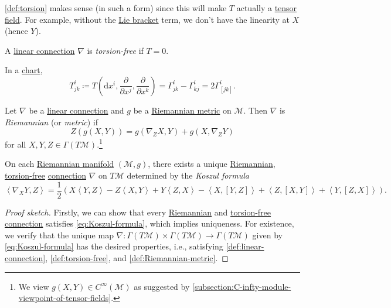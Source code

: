 \begin{intuition}
	\autoref{def:torsion} makes sense (in such a form) since this will make \(T\) actually a \hyperref[def:tensor-field]{tensor field}. For example, without the \hyperref[def:bracket]{Lie bracket} term, we don't have the linearity at \(X\) (hence \(Y\)).
\end{intuition}

\begin{definition}\label{def:torsion-free}
	A \hyperref[def:linear-connection]{linear connection} \(\nabla \) is \emph{torsion-free} if \(T = 0\).
\end{definition}

In a \hyperref[def:coordinate-chart]{chart},
\[
	T^i_{jk} \coloneqq T\left( \mathrm{d} x^i, \frac{\partial }{\partial x^j} , \frac{\partial }{\partial x^k} \right) = \Gamma ^i_{jk} - \Gamma ^i_{kj} = 2\Gamma ^i_{[jk]}.
\]

\begin{definition}[Riemannian]\label{def:Riemannian}
	Let \(\nabla \) be a \hyperref[def:linear-connection]{linear connection} and \(g\) be a \hyperref[def:Riemannian-metric]{Riemannian metric} on \(\mathcal{M} \). Then \(\nabla \) is \emph{Riemannian} (or \emph{metric}) if
	\[
		Z(g(X, Y)) = g(\nabla _{Z} X, Y) + g(X, \nabla _{Z} Y)
	\]
	for all \(X, Y, Z\in \Gamma (T\mathcal{M} )\).\footnote{We view \(g(X, Y)\in C^{\infty} (\mathcal{M} )\) as suggested by \autoref{subsection:C-infty-module-viewpoint-of-tensor-fields}.}
\end{definition}

\begin{proposition}\label{prop:Koszul-formula}
	On each \hyperref[def:Riemannian-manifold]{Riemannian manifold} \((\mathcal{M} , g)\), there exists a unique \hyperref[def:Riemannian]{Riemannian}, \hyperref[def:torsion-free]{torsion-free} \hyperref[def:linear-connection]{connection} \(\nabla \) on \(T\mathcal{M} \) determined by the \emph{Koszul formula}
	\begin{equation}\label{eq:Koszul-formula}
		\left\langle \nabla _X Y, Z \right\rangle = \frac{1}{2} \left( X \left\langle Y, Z \right\rangle - Z\left\langle X, Y \right\rangle + Y\left\langle Z, X \right\rangle - \left\langle X, [Y, Z] \right\rangle + \left\langle Z, [X, Y] \right\rangle + \left\langle Y, [Z, X] \right\rangle \right).
	\end{equation}
\end{proposition}
\begin{proof}[Proof sketch]
	Firstly, we can show that every \hyperref[def:Riemannian]{Riemannian} and \hyperref[def:torsion-free]{torsion-free} \hyperref[def:linear-connection]{connection} satisfies \autoref{eq:Koszul-formula}, which implies uniqueness. For existence, we verify that the unique map \(\nabla \colon \Gamma (T \mathcal{M} ) \times \Gamma (T \mathcal{M} )\to \Gamma (T\mathcal{M} )\) given by \autoref{eq:Koszul-formula} has the desired properties, i.e., satisfying \autoref{def:linear-connection}, \autoref{def:torsion-free}, and \autoref{def:Riemannian-metric}.
\end{proof}

